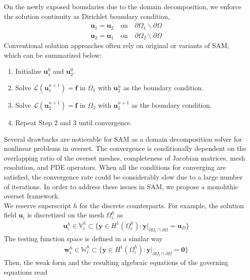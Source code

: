 \documentclass[preprint,12pt,sort&compress]{elsarticle}
\theoremstyle{definition}%
\begin{document}
On the newly exposed boundaries due to the domain decomposition, we enforce the solution continuity as Dirichlet boundary condition,
\begin{align}
  \bm{u}_1 = \bm{u}_2 \quad \text{on} \quad \partial \Omega_1 \backslash \partial \Omega\\
  \bm{u}_2 = \bm{u}_1 \quad \text{on} \quad \partial \Omega_2 \backslash \partial \Omega
\end{align}
Conventional solution approaches often rely on original or variants of SAM, which can be summarized below:
\begin{enumerate}\label{alg:sam}
  \item Initialize $\bm{u}_1^0$ and $\bm{u}_2^0$.
  \item Solve $\mathcal{L}(\bm{u}_1^{n+1}) = \bm{f}$ in $\Omega_1$ with $\bm{u}_2^n$ as the boundary condition.
  \item Solve $\mathcal{L}(\bm{u}_2^{n+1}) = \bm{f}$ in $\Omega_2$ with $\bm{u}_1^{n+1}$ as the boundary condition.
  \item Repeat Step 2 and 3 until convergence.
\end{enumerate}
Several drawbacks are noticeable for SAM as a domain decomposition solver for nonlinear problems in overset. 
The convergence is conditionally dependent on the overlapping ratio of the overset meshes, completeness of Jacobian matrices, mesh resolution, and PDE operators.
When all the conditions for converging are satisfied, the convergence rate could be considerably slow due to a large number of iterations.
In order to address these issues in SAM, we propose a monolithic overset framework.\\
We reserve superscript $h$ for the discrete counterparts. For example, the solution field $\bm{u}_i$ is discretized on the mesh $\Omega_i^h$ as
\begin{align}
  \bm{u}^h_i\in\mathbb{V}^h_i\subset \{\bm{y}\in H^1(\Omega_i^h): \bm{y}|_{\partial\Omega_i\cap\partial\Omega}=\bm{u}_D\}
\end{align}
The testing function space is defined in a similar way
\begin{align}
\bm{w}_i^h\in\mathbb{W}_i^h \subset\{\bm{y}\in H^1(\Omega_i^h): \bm{y}|_{\partial\Omega_i\cap\partial\Omega}=\bm{0}\}
\end{align}
Then, the weak form and the resulting algebraic equations of the governing equations read
\end{document}
